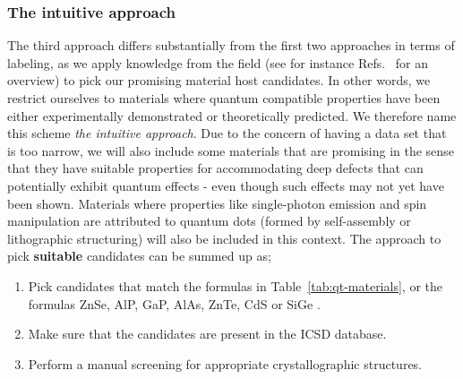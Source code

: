 \documentclass[superscriptaddress,unsortedaddress,
 amsmath,amssymb,
 aps,
]{revtex4-2}
\begin{document}
\subsubsection*{The intuitive approach}
The third approach differs substantially from the first two approaches in terms of labeling, as we apply knowledge from the field (see for instance Refs.~\cite{Atatuere2018,Zhang2020,Son2020,Toth2019,Bathen2021} for an overview) to pick our promising material host candidates. 
In other words, we restrict ourselves to materials where quantum compatible properties have been either experimentally demonstrated or theoretically predicted. 
We therefore name this scheme \emph{the intuitive approach}. Due to the concern of having a data set that is too narrow, we will also include some  materials that are promising in the sense that they have suitable properties for accommodating deep defects that can potentially exhibit quantum effects - even though such effects may not yet have been shown. 
Materials where properties like single-photon emission and spin manipulation are attributed to quantum dots (formed by self-assembly or lithographic structuring) will also be included in this context.  
The approach to pick \textbf{suitable} candidates can be summed up as;   
\begin{enumerate}
    \item Pick candidates that match the formulas in Table~\ref{tab:qt-materials}, or the formulas ZnSe, AlP, GaP, AlAs, ZnTe, CdS \cite{Weber2010} or SiGe \cite{Hardy2019}. 
    \item Make sure that the candidates are present in the ICSD database.  
    \item Perform a manual screening for appropriate crystallographic structures. 
\end{enumerate}
\end{document}

